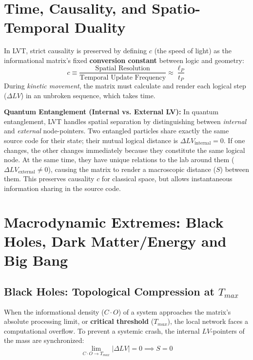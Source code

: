 \documentclass[12pt,a4paper]{article}
\begin{document}
\section{Time, Causality, and Spatio-Temporal Duality}

In LVT, strict causality is preserved by defining $c$ (the speed of light) as the informational matrix's fixed \textbf{conversion constant} between logic and geometry:
\begin{equation}
c \equiv \frac{\text{Spatial Resolution}}{\text{Temporal Update Frequency}} \approx \frac{\ell_P}{t_P}
\end{equation}
During \textit{kinetic movement}, the matrix must calculate and render each logical step ($\Delta LV$) in an unbroken sequence, which takes time. 

\textbf{Quantum Entanglement (Internal vs. External LV):} 
In quantum entanglement, LVT handles spatial separation by distinguishing between \textit{internal} and \textit{external} node-pointers. Two entangled particles share exactly the same source code for their state; their mutual logical distance is $\Delta LV_{\text{internal}} = 0$. If one changes, the other changes immediately because they constitute the same logical node. At the same time, they have unique relations to the lab around them ($\Delta LV_{\text{external}} \neq 0$), causing the matrix to render a macroscopic distance ($S$) between them.  This preserves causality $c$ for classical space, but allows instantaneous information sharing in the source code.

\section{Macrodynamic Extremes: Black Holes, Dark Matter/Energy and Big Bang}

\subsection{Black Holes: Topological Compression at $T_{max}$}
When the informational density ($C \cdot O$) of a system approaches the matrix's absolute processing limit, or \textbf{critical threshold} ($T_{max}$), the local network faces a computational overflow. To prevent a systemic crash, the internal $LV$-pointers of the mass are synchronized:
\begin{equation}
\lim_{C \cdot O \to T_{max}} |\Delta LV| = 0 \implies S = 0
\end{equation}
\end{document}
